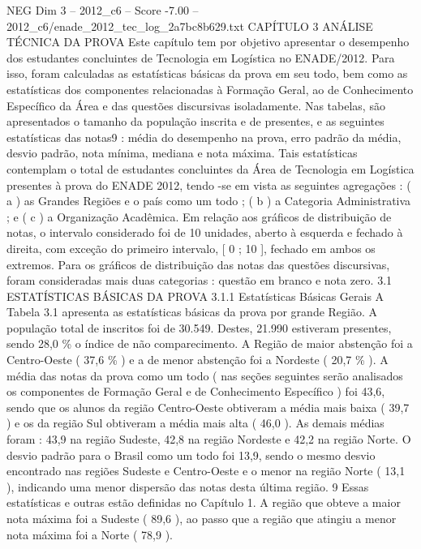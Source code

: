 \begin{textsample}{NEG Dim 3 – 2012\_c6 – Score -7.00 – 2012\_c6/enade\_2012\_tec\_log\_2a7bc8b629.txt}  \label{ex:f3_neg_029}
CAPÍTULO 3 ANÁLISE TÉCNICA DA PROVA Este capítulo tem por objetivo apresentar o desempenho dos estudantes concluintes de Tecnologia em Logística no ENADE/2012.
Para isso, foram calculadas as estatísticas básicas da prova em seu todo, bem como as estatísticas dos componentes relacionadas à Formação Geral, ao de Conhecimento Específico da Área e das questões discursivas isoladamente.
Nas tabelas, são apresentados o tamanho da população inscrita e de presentes, e as seguintes estatísticas das notas9 : média do desempenho na prova, erro padrão da média, desvio padrão, nota mínima, mediana e nota máxima.
Tais estatísticas contemplam o total de estudantes concluintes da Área de Tecnologia em Logística presentes à prova do ENADE 2012, tendo -se em vista as seguintes agregações : ( a ) as Grandes Regiões e o país como um todo ; ( b ) a Categoria Administrativa ; e ( c ) a Organização Acadêmica.
Em relação aos gráficos de distribuição de notas, o intervalo considerado foi de 10 unidades, aberto à esquerda e fechado à direita, com exceção do primeiro intervalo, [ 0 ; 10 ], fechado em ambos os extremos.
Para os gráficos de distribuição das notas das questões discursivas, foram consideradas mais duas categorias : questão em branco e nota zero. 3.1 ESTATÍSTICAS BÁSICAS DA PROVA 3.1.1 Estatísticas Básicas Gerais A Tabela 3.1 apresenta as estatísticas básicas da prova por grande Região.
A população total de inscritos foi de 30.549.
Destes, 21.990 estiveram presentes, sendo 28,0 \% o índice de não comparecimento.
A Região de maior abstenção foi a Centro-Oeste ( 37,6 \% ) e a de menor abstenção foi a Nordeste ( 20,7 \% ).
A média das notas da prova como um todo ( nas seções seguintes serão analisados os componentes de Formação Geral e de Conhecimento Específico ) foi 43,6, sendo que os alunos da região Centro-Oeste obtiveram a média mais baixa ( 39,7 ) e os da região Sul obtiveram a média mais alta ( 46,0 ).
As demais médias foram : 43,9 na região Sudeste, 42,8 na região Nordeste e 42,2 na região Norte.
O desvio padrão para o Brasil como um todo foi 13,9, sendo o mesmo desvio encontrado nas regiões Sudeste e Centro-Oeste e o menor na região Norte ( 13,1 ), indicando uma menor dispersão das notas desta última região. 9 Essas estatísticas e outras estão definidas no Capítulo 1.
A região que obteve a maior nota máxima foi a Sudeste ( 89,6 ), ao passo que a região que atingiu a menor nota máxima foi a Norte ( 78,9 ).

\end{textsample}
